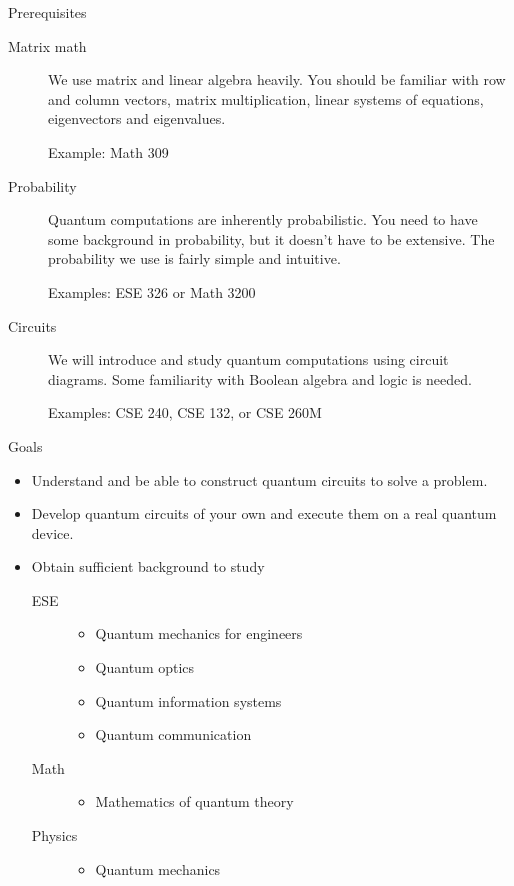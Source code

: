 \begin{frame}{Prerequisites}
\begin{description}
    \item[Matrix math]  We use matrix and linear algebra heavily.  You should be familiar with row and column vectors, matrix multiplication, linear systems of equations, eigenvectors and eigenvalues.
    
    Example:  Math 309
    \item[Probability] Quantum computations are inherently probabilistic.  You need to have some background in probability, but it doesn't have to be extensive.  The probability we use is fairly simple and intuitive.
    
    Examples:  ESE 326 or Math 3200
    \item[Circuits]  We will introduce and study quantum computations using circuit diagrams.    Some familiarity with Boolean algebra and logic is needed.
    
    Examples:  CSE 240, CSE 132, or CSE 260M
\end{description}
\end{frame}
\begin{frame}{Goals}
\begin{itemize}
    \item Understand and be able to construct quantum circuits to solve a problem.
    \item Develop quantum circuits of your own and execute them on a real quantum device.
    \item Obtain sufficient background to study
    \begin{description}
        \item[ESE] 
        \begin{itemize}
            \item Quantum mechanics for engineers
            \item Quantum optics
            \item Quantum information systems
            \item Quantum communication
        \end{itemize}
        \item [Math]
        \begin{itemize}
            \item Mathematics of quantum theory
        \end{itemize}
        \item[Physics]
        \begin{itemize}
            \item Quantum mechanics
        \end{itemize}
    \end{description} 
\end{itemize}
\end{frame}


